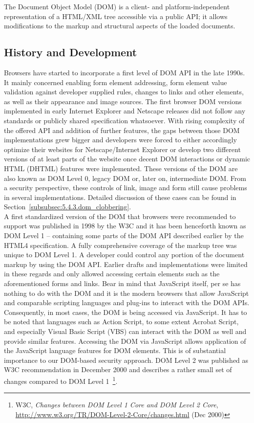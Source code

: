     The Document Object Model (DOM) is a client- and platform-independent representation of a HTML/XML tree accessible via a public API; it allows modifications to the markup and structural aspects of the loaded documents. 

    \subsection{History and Development}
    \label{subsubsec:6.2.1.history_and_development}

    Browsers have started to incorporate a first level of DOM API in the late 1990s. It mainly concerned enabling form element addressing, form element value validation against developer supplied rules, changes to links and other elements, as well as their appearance and image sources. The first browser DOM  versions implemented in early Internet Explorer and Netscape releases did not follow any standards or publicly shared specification whatsoever. With rising complexity of the offered API and addition of further features, the gaps between those DOM implementations grew bigger and developers were forced to either accordingly optimize their websites for Netscape/Internet Explorer or develop two different versions of at least parts of the website once decent DOM interactions or dynamic HTML (DHTML) features were implemented. These versions of the DOM are also known as DOM Level 0, legacy DOM or, later on, intermediate DOM. From a security perspective, these controls of link, image and form still cause problems in several implementations. Detailed discussion of these cases can be found in Section~\ref{subsubsec:5.4.3.dom_clobbering}.\\

    A first standardized version of the DOM that browsers were recommended to support was published in 1998 by the W3C and it has been henceforth known as DOM Level 1 -- containing some parts of the DOM API described earlier by the HTML4 specification. A fully comprehensive coverage of the markup tree was unique to DOM Level 1. A developer could control any portion of the document markup by using the DOM API. Earlier drafts and implementations were limited in these regards and only allowed accessing certain elements such as the aforementioned forms and links. Bear in mind that JavaScript itself, per se has nothing to do with the DOM and it is the modern browsers that allow JavaScript and comparable scripting languages and plug-ins to interact with the DOM APIs. Consequently, in most cases, the DOM is being accessed via JavaScript. It has to be noted that languages such as Action Script, to some extent Acrobat Script, and especially Visual Basic Script (VBS) can interact with the DOM as well and provide similar features. Accessing the DOM via JavaScript allows application of the JavaScript language features for DOM elements. This is of substantial importance to our DOM-based security approach. DOM Level 2 was published as W3C recommendation in December 2000 and describes a rather small set of changes compared to DOM Level 1~\footnote{W3C, \textit{Changes between DOM Level 1 Core and DOM Level 2 Core}, \url{http://www.w3.org/TR/DOM-Level-2-Core/changes.html} (Dec 2000)}.\\

